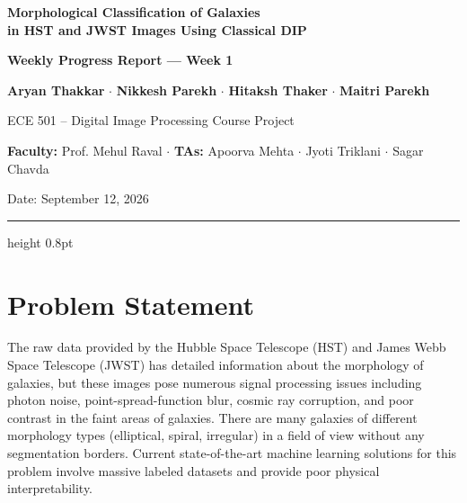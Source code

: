 \documentclass[11pt]{article}
\begin{document}
\thispagestyle{fancy}


\begin{center}

\Large\textbf{Morphological Classification of Galaxies\\
in HST and JWST Images Using Classical DIP}

\vspace{3pt}

\normalsize\textbf{Weekly Progress Report --- Week 1}

\vspace{4pt}

\small
\textbf{Aryan Thakkar}
\quad $\cdot$ \quad
\textbf{Nikkesh Parekh}
\quad $\cdot$ \quad
\textbf{Hitaksh Thaker}
\quad $\cdot$ \quad
\textbf{Maitri Parekh}

\vspace{3pt}

\small ECE 501 -- Digital Image Processing Course Project

\vspace{2pt}

\small\textbf{Faculty:} Prof. Mehul Raval
\quad $\cdot$ \quad
\textbf{TAs:} Apoorva Mehta \quad $\cdot$ \quad Jyoti Triklani \quad $\cdot$ \quad Sagar Chavda

\vspace{3pt}

\small Date: September 12, 2026

\end{center}

\vspace{1pt}
\hrule height 0.8pt
\vspace{3pt}


\section{Problem Statement}

The raw data provided by the Hubble Space Telescope (HST) and James Webb Space Telescope (JWST) has detailed information about the morphology of galaxies, but these images pose numerous signal processing issues including photon noise, point-spread-function blur, cosmic ray corruption, and poor contrast in the faint areas of galaxies. There are many galaxies of different morphology types (elliptical, spiral, irregular) in a field of view without any segmentation borders. Current state-of-the-art machine learning solutions for this problem involve massive labeled datasets and provide poor physical interpretability.
\end{document}
